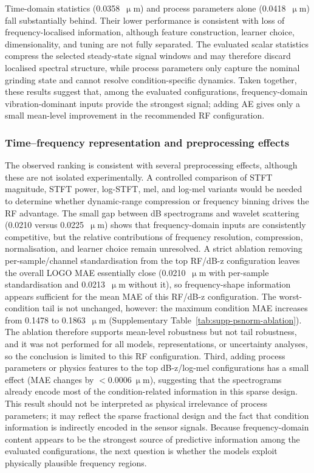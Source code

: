 Time-domain statistics (0.0358~\(\upmu\)m) and process parameters alone
(0.0418~\(\upmu\)m) fall substantially behind. Their lower performance is
consistent with loss of frequency-localised information, although feature
construction, learner choice, dimensionality, and tuning are not fully
separated. The evaluated scalar statistics compress the selected
steady-state signal windows and may therefore discard localised spectral
structure, while process parameters only capture the nominal grinding state
and cannot resolve condition-specific dynamics. Taken together, these results suggest that,
among the evaluated configurations, frequency-domain vibration-dominant
inputs provide the strongest signal; adding AE gives only a small
mean-level improvement in the recommended RF configuration.

\subsubsection{Time--frequency representation and preprocessing effects}\label{sec:preprocessing-effects}

The observed ranking is consistent with several preprocessing effects,
although these are not isolated experimentally. A controlled comparison
of STFT magnitude, STFT power, log-STFT, mel, and log-mel variants would
be needed to determine whether dynamic-range compression or frequency
binning drives the RF advantage. The small gap between dB spectrograms and
wavelet scattering (0.0210 versus 0.0225~\(\upmu\)m) shows that
frequency-domain inputs are consistently competitive, but the relative
contributions of frequency resolution, compression, normalisation, and
learner choice remain unresolved. A strict ablation removing per-sample/channel standardisation from the
top RF/dB-z configuration leaves the overall LOGO MAE essentially
close (0.0210~\(\upmu\)m with per-sample standardisation and
0.0213~\(\upmu\)m without it), so frequency-shape
information appears sufficient for the mean MAE of this RF/dB-z
configuration. The worst-condition tail is not unchanged, however: the
maximum condition MAE increases from 0.1478 to 0.1863~\(\upmu\)m
(Supplementary Table~\ref{tab:supp-psnorm-ablation}). The ablation therefore supports
mean-level robustness but not tail robustness, and it was not
performed for all models, representations, or uncertainty analyses, so the
conclusion is limited to this RF configuration. Third, adding process parameters or physics
features to the top dB-z/log-mel configurations has a small effect (MAE
changes by \(<0.0006~\upmu\)m), suggesting that the spectrograms already
encode most of the condition-related information in this sparse design.
This result should not be interpreted as physical irrelevance of process
parameters; it may reflect the sparse fractional design and the fact
that condition information is indirectly encoded in the sensor signals.
Because frequency-domain content appears to be the strongest source of
predictive information among the evaluated configurations, the next
question is whether the models exploit physically plausible frequency
regions.

